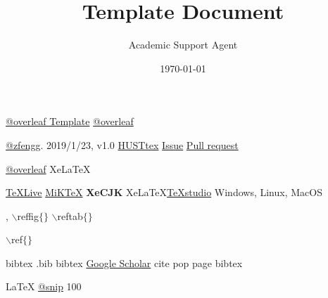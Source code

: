 \documentclass{article}
\title{Template Document}
\author{Academic Support Agent}
\date{\today}
\begin{document}
\maketitle

\maketitle 

\thispagestyle{main}


\setcounter{page}{1}
\renewcommand{\thepage}{\arabic{page}}
\section{ }\seccontent
\begin{description}
	\seccontent
    \item[ ] 
     \href{https://www.overleaf.com/}{@overleaf Template}  \href{https://www.overleaf.com/latex/templates/husttex-hua-zhong-ke-ji-da-xue-ben-ke-lun-wen-xi-lie-mo-ban/ydnfhgxgsxkn}{@overleaf} 
    
	\item[ ] 
      \href{https://github.com/zfengg}{@zfengg}.  2019/1/23, v1.0  \href{https://github.com/zfengg/HUSTtex}{HUSTtex}     \href{https://github.com/zfengg/HUSTtex/issues}{Issue}   \href{https://github.com/zfengg/HUSTtex/pulls}{Pull request} 
    \item[ ]   \href{https://www.overleaf.com/latex/templates/husttex-hua-zhong-ke-ji-da-xue-ben-ke-lun-wen-xi-lie-mo-ban/ydnfhgxgsxkn}{@overleaf} Xe\LaTeX 
    
	\item[ ]  
 
       \href{http://www.tug.org/texli ve/}{TeXLive}  \href{http://miktex.org/}{MiKTeX} \textbf{XeCJK}  Xe\LaTeX    \href{http://texstudio.sourceforge.net/}{TeXstudio}    Windows, Linux, MacOS  
	\item[ ]  ,  $\backslash$reffig$\lbrace\rbrace$  $\backslash$reftab$\lbrace\rbrace$ 
	\item[ ]  $\backslash$ref$\lbrace\rbrace$ 
	\item[ ]  bibtex .bib bibtex \href{https://scholar.google.com}{Google Scholar} cite pop page bibtex 
    \item[LaTeX ]  LaTeX \href{https://snip.mathpix.com}{@snip} 100 
 
\end{description}

\section{ }
\end{document}
